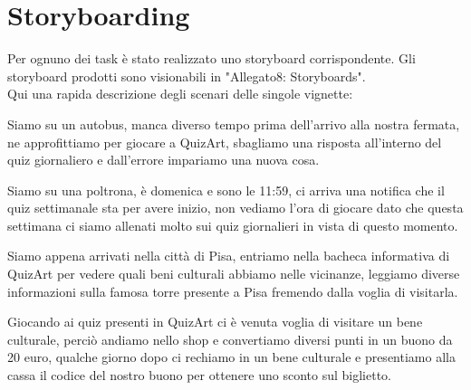 \documentclass{article}
\begin{document}
\section{Storyboarding}
Per ognuno dei task è stato realizzato uno storyboard corrispondente. Gli storyboard prodotti sono visionabili in "Allegato8: Storyboards"\cite{Allegato8}.\\
Qui una rapida descrizione degli scenari delle singole vignette:
\begin{description}
\addtolength{\itemindent}{0.5cm}
\item [Quiz giornaliero] Siamo su un autobus, manca diverso tempo prima dell’arrivo alla nostra fermata, ne approfittiamo per giocare a QuizArt, sbagliamo una risposta all’interno del quiz giornaliero e dall’errore impariamo una nuova cosa.
\item [Quiz settimanale] Siamo su una poltrona, è domenica e sono le 11:59, ci arriva una notifica che il quiz settimanale sta per avere inizio, non vediamo l’ora di giocare dato che questa settimana ci siamo allenati molto sui quiz giornalieri in vista di questo momento.
\item [Bacheca informativa] Siamo appena arrivati nella città di Pisa, entriamo nella bacheca informativa di QuizArt per vedere quali beni culturali abbiamo nelle vicinanze, leggiamo diverse informazioni sulla famosa torre presente a Pisa fremendo dalla voglia di visitarla.
\item [Shop Buoni] Giocando ai quiz presenti in QuizArt ci è venuta voglia di visitare un bene culturale, perciò andiamo nello shop e convertiamo diversi punti in un buono da 20 euro, qualche giorno dopo ci rechiamo in un bene culturale e presentiamo alla cassa il codice del nostro buono per ottenere uno sconto sul biglietto.
\end{description}
\end{document}
